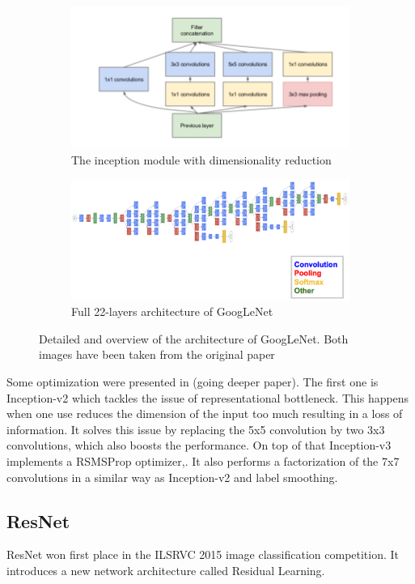 \begin{figure}
\begin{subfigure}{.5\textwidth}
  \centering
  \includegraphics[width=.8\linewidth]{figures/02-inception_module}
  \caption{The inception module with dimensionality reduction }
  \label{fig:inception}
\end{subfigure}%
\begin{subfigure}{.5\textwidth}
  \centering
  \includegraphics[width=.8\linewidth]{figures/02-googlearch}
  \caption{Full 22-layers architecture of GoogLeNet}
  \label{fig:googl}
\end{subfigure}
\caption[Inception network architecture]{Detailed and overview of the architecture of GoogLeNet. Both images have been taken from the original paper \cite{googlepaper}}
\end{figure}
Some optimization were presented in (going deeper paper). The first one is Inception-v2 which tackles the issue of representational bottleneck. This happens when one use reduces the dimension of the input too much resulting in a loss of information. It solves this issue by replacing the 5x5 convolution by two 3x3 convolutions, which also boosts the performance. On top of that Inception-v3 implements a RSMSProp optimizer,. It also performs a factorization of the 7x7 convolutions in a similar way as Inception-v2 and label smoothing. 

\subsection{ResNet}
ResNet won first place in the ILSRVC 2015 image classification competition. It introduces a new network architecture called Residual Learning. 

